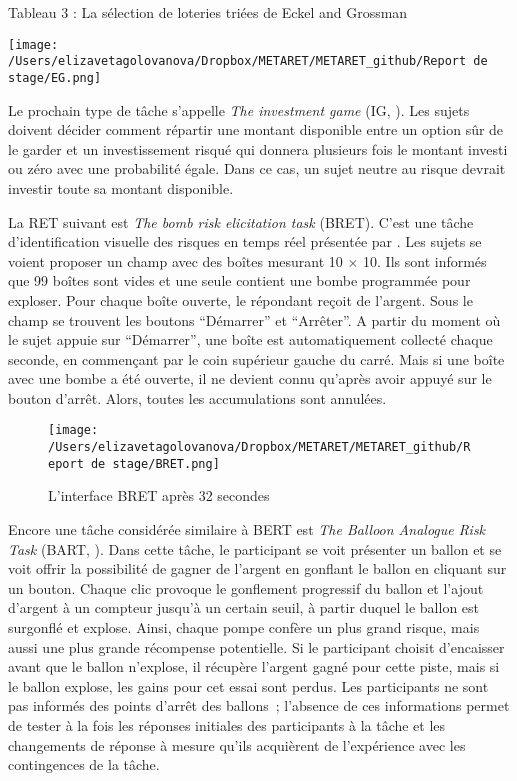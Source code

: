 \documentclass[12pt]{article}
\begin{document}
Tableau 3 : La sélection de loteries triées de Eckel and Grossman

\hfil \texttt{[image: /Users/elizavetagolovanova/Dropbox/METARET/METARET\_github/Report de stage/EG.png]}
\hfil

Le prochain type de tâche s'appelle \emph{The investment game} (IG,
\citet{Gneezy1997}). Les sujets doivent décider comment répartir une
montant disponible entre un option sûr de le garder et un investissement
risqué qui donnera plusieurs fois le montant investi ou zéro avec une
probabilité égale. Dans ce cas, un sujet neutre au risque devrait
investir toute sa montant disponible.

La RET suivant est \emph{The bomb risk elicitation task} (BRET). C'est
une tâche d'identification visuelle des risques en temps réel présentée
par \citet{CroFil2013b}. Les sujets se voient proposer un champ avec des
boîtes mesurant 10 × 10. Ils sont informés que 99 boîtes sont vides et
une seule contient une bombe programmée pour exploser. Pour chaque boîte
ouverte, le répondant reçoit de l'argent. Sous le champ se trouvent les
boutons ``Démarrer'' et ``Arrêter''. A partir du moment où le sujet
appuie sur ``Démarrer'', une boîte est automatiquement collecté chaque
seconde, en commençant par le coin supérieur gauche du carré. Mais si
une boîte avec une bombe a été ouverte, il ne devient connu qu'après
avoir appuyé sur le bouton d'arrêt. Alors, toutes les accumulations sont
annulées.

\begin{figure}
\centering
\texttt{[image: /Users/elizavetagolovanova/Dropbox/METARET/METARET\_github/Report de stage/BRET.png]}
\caption{L'interface BRET après 32 secondes}
\end{figure}

Encore une tâche considérée similaire à BERT est \emph{The Balloon
Analogue Risk Task} (BART, \citet{Hunt2005}). Dans cette tâche, le
participant se voit présenter un ballon et se voit offrir la possibilité
de gagner de l'argent en gonflant le ballon en cliquant sur un bouton.
Chaque clic provoque le gonflement progressif du ballon et l'ajout
d'argent à un compteur jusqu'à un certain seuil, à partir duquel le
ballon est surgonflé et explose. Ainsi, chaque pompe confère un plus
grand risque, mais aussi une plus grande récompense potentielle. Si le
participant choisit d'encaisser avant que le ballon n'explose, il
récupère l'argent gagné pour cette piste, mais si le ballon explose, les
gains pour cet essai sont perdus. Les participants ne sont pas informés
des points d'arrêt des ballons~; l'absence de ces informations permet de
tester à la fois les réponses initiales des participants à la tâche et
les changements de réponse à mesure qu'ils acquièrent de l'expérience
avec les contingences de la tâche.
\end{document}
